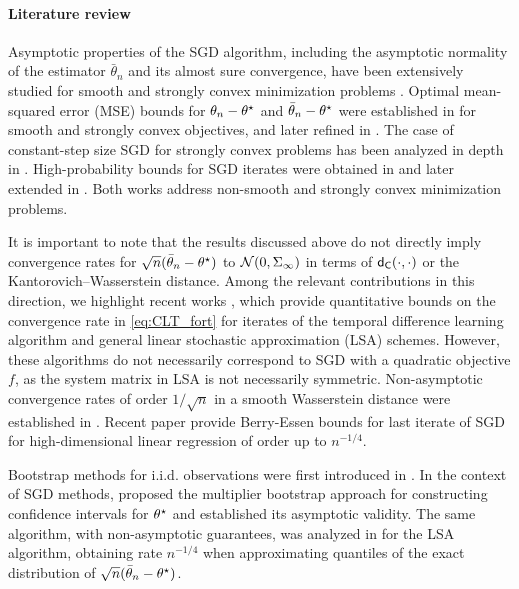 \paragraph{Literature review}
Asymptotic properties of the SGD algorithm, including the asymptotic normality of the estimator $\bar{\theta}_n$ and its almost sure convergence, have been extensively studied for smooth and strongly convex minimization problems \cite{polyak1992acceleration, kushner2003stochastic, benveniste2012adaptive}. Optimal mean-squared error (MSE) bounds for $\theta_n - \theta^\star$ and $\bar{\theta}_n - \theta^\star$ were established in \cite{nemirovski2009robust} for smooth and strongly convex objectives, and later refined in \cite{moulines2011non}. The case of constant-step size SGD for strongly convex problems has been analyzed in depth in \cite{durmus2020biassgd}.   High-probability bounds for SGD iterates were obtained in \cite{rakhlin2012making} and later extended in \cite{harvey2019tight}. Both works address non-smooth and strongly convex minimization problems. %
\par 
It is important to note that the results discussed above do not directly imply convergence rates for $\sqrt{n}(\bar{\theta}_{n} - \theta^\star)$ to $\mathcal{N}(0,\Sigma_\infty)$ in terms of $\mathsf{d}_{\mathsf{C}}(\cdot, \cdot)$ or the Kantorovich--Wasserstein distance. Among the relevant contributions in this direction, we highlight recent works \cite{srikant2024rates, samsonov2024gaussian, wu2024statistical}, which provide quantitative bounds on the convergence rate in \eqref{eq:CLT_fort} for iterates of the temporal difference learning algorithm and general linear stochastic approximation (LSA) schemes. However, these algorithms do not necessarily correspond to SGD with a quadratic objective $f$, as the system matrix in LSA is not necessarily symmetric. Non-asymptotic convergence rates of order $1/\sqrt{n}$ in a smooth Wasserstein distance were established in \cite{pmlr-v99-anastasiou19a}. Recent paper \cite{agrawalla2023high} provide Berry-Essen bounds for last iterate of SGD for high-dimensional linear regression of order up to $n^{-1/4}$.
\par 
Bootstrap methods for i.i.d. observations were first introduced in \cite{efron1992bootstrap}. In the context of SGD methods, \cite{JMLR:v19:17-370} proposed the multiplier bootstrap approach for constructing confidence intervals for $\theta^\star$ and established its asymptotic validity. The same algorithm, with non-asymptotic guarantees, was analyzed in \cite{samsonov2024gaussian} for the LSA algorithm, obtaining rate $n^{-1/4}$ when approximating quantiles of the exact distribution of $\sqrt{n}(\bar{\theta}_n - \theta^\star)$.
